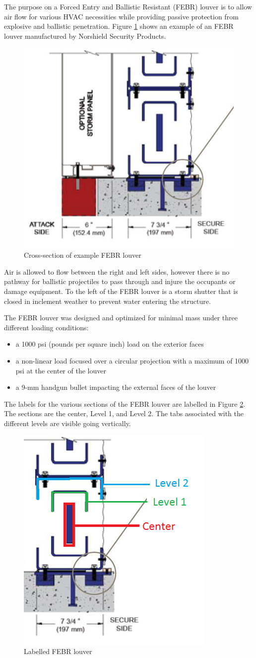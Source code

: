 \documentclass[12pt,letterpaper]{report}
\begin{document}
		The purpose on a Forced Entry and Ballistic Resistant (FEBR) louver is to allow air flow for various HVAC necessities while providing passive protection from explosive and ballistic penetration.  Figure \ref{fig:CSec} shows an example of an FEBR louver manufactured by Norshield Security Products.
		
		\begin{figure}
			\centering
			\includegraphics[width=.45\textwidth]{CrossSection}
			\caption{Cross-section of example FEBR louver}
			\label{fig:CSec}
		\end{figure}
		
		Air is allowed to flow between the right and left sides, however there is no pathway for ballistic projectiles to pass through and injure the occupants or damage equipment.  To the left of the FEBR louver is a storm shutter that is closed in inclement weather to prevent water entering the structure.
		
		The FEBR louver was designed and optimized for minimal mass under three different loading conditions:
		\begin{itemize}
			\item a 1000 psi (pounds per square inch) load on the exterior faces
			\item a non-linear load focused over a circular projection with a maximum of 1000 psi at the center of the louver
			\item a 9-mm handgun bullet impacting the external faces of the louver
		\end{itemize}
		
		The labels for the various sections of the FEBR louver are labelled in Figure \ref{fig:Labels}.  The sections are the center, Level 1, and Level 2.  The tabs associated with the different levels are visible going vertically. \nopagebreak[4] \begin{figure}[H]
			\centering
			\includegraphics[width=.45\textwidth]{Labelled}
			\caption{Labelled FEBR louver}
			\label{fig:Labels}
		\end{figure}
		
\end{document}

